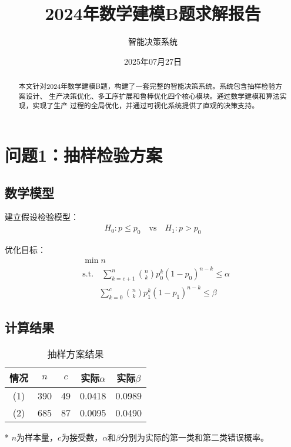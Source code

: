 \documentclass[12pt]{article}
\title{2024年数学建模B题求解报告}
\author{智能决策系统}
\date{2025年07月27日}
\begin{document}
\maketitle

\begin{abstract}
本文针对2024年数学建模B题，构建了一套完整的智能决策系统。系统包含抽样检验方案设计、
生产决策优化、多工序扩展和鲁棒优化四个核心模块。通过数学建模和算法实现，实现了生产
过程的全局优化，并通过可视化系统提供了直观的决策支持。
\end{abstract}

\section{问题1：抽样检验方案}
\subsection{数学模型}

建立假设检验模型：
\begin{equation}
\begin{aligned}
H_0: p \leq p_0 \quad \text{vs} \quad H_1: p > p_0
\end{aligned}
\end{equation}

优化目标：
\begin{equation}
\begin{aligned}
& \min n \\
& \text{s.t.} \quad \sum_{k=c+1}^{n} \binom{n}{k} p_0^k (1-p_0)^{n-k} \leq \alpha \\
& \qquad \sum_{k=0}^{c} \binom{n}{k} p_1^k (1-p_1)^{n-k} \leq \beta
\end{aligned}
\end{equation}

\subsection{计算结果}

\begin{table}[htbp]
\centering
\caption{抽样方案结果}
\begin{threeparttable}
\begin{tabular}{@{}ccccc@{}}
\toprule
情况 & $n$ & $c$ & 实际$\alpha$ & 实际$\beta$ \\
\midrule
(1) & 390 & 49 & 0.0418 & 0.0989 \\
(2) & 685 & 87 & 0.0095 & 0.0490 \\
\bottomrule
\end{tabular}
\begin{tablenotes}
\item[*] $n$为样本量，$c$为接受数，$\alpha$和$\beta$分别为实际的第一类和第二类错误概率。
\end{tablenotes}
\end{threeparttable}
\end{table}
\end{document}
